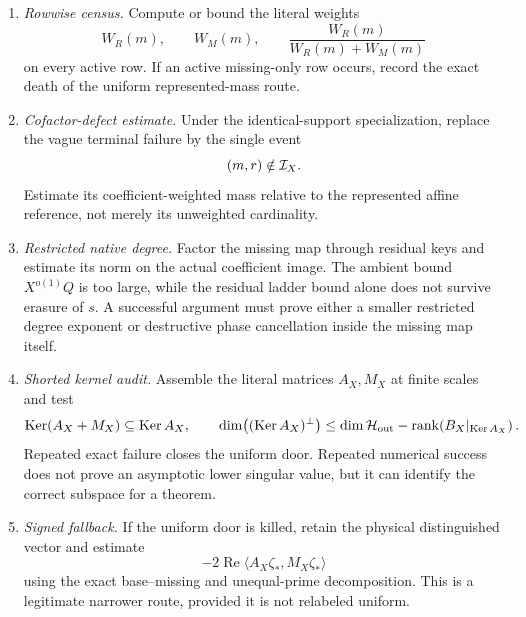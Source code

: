\begin{enumerate}[leftmargin=2.3em]
 \item \emph{Rowwise census.}  Compute or bound the literal weights
 \begin{equation}
  W_R(m),\qquad W_M(m),\qquad
  \frac{W_R(m)}{W_R(m)+W_M(m)}
  \label{eq:tpc60-next-row-census}
 \end{equation}
 on every active row.  If an active missing-only row occurs, record the
 exact death of the uniform represented-mass route.

 \item \emph{Cofactor-defect estimate.}  Under the identical-support
 specialization, replace the vague terminal failure by the single event
 \begin{equation}
  (m,r)\notin\mathcal I_X.
  \label{eq:tpc60-next-cofactor-defect}
 \end{equation}
 Estimate its coefficient-weighted mass relative to the represented
 affine reference, not merely its unweighted cardinality.

 \item \emph{Restricted native degree.}  Factor the missing map through
 residual keys and estimate its norm on the actual coefficient image.
 The ambient bound \(X^{o(1)}Q\) is too large, while the residual ladder
 bound alone does not survive erasure of \(s\).  A successful argument
 must prove either a smaller restricted degree exponent or destructive
 phase cancellation inside the missing map itself.

 \item \emph{Shorted kernel audit.}  Assemble the literal matrices
 \(A_X,M_X\) at finite scales and test
 \begin{equation}
  \operatorname{Ker}(A_X+M_X)\subseteq\operatorname{Ker} A_X,
  \qquad
  \dim\bigl((\operatorname{Ker} A_X)^\perp\bigr)
  \le\dim\mathcal H_{\rm out}
       -\operatorname{rank}\!\left(B_X|_{\operatorname{Ker} A_X}\right).
  \label{eq:tpc60-next-kernel-audit}
 \end{equation}
 Repeated exact failure closes the uniform door.  Repeated numerical
 success does not prove an asymptotic lower singular value, but it can
 identify the correct subspace for a theorem.

 \item \emph{Signed fallback.}  If the uniform door is killed, retain the
 physical distinguished vector and estimate
 \begin{equation}
  -2\operatorname{Re}
    \langle A_X\zeta_*,M_X\zeta_*\rangle
  \label{eq:tpc60-next-signed-cross-term}
 \end{equation}
 using the exact base--missing and unequal-prime decomposition.  This is a
 legitimate narrower route, provided it is not relabeled uniform.
\end{enumerate}

